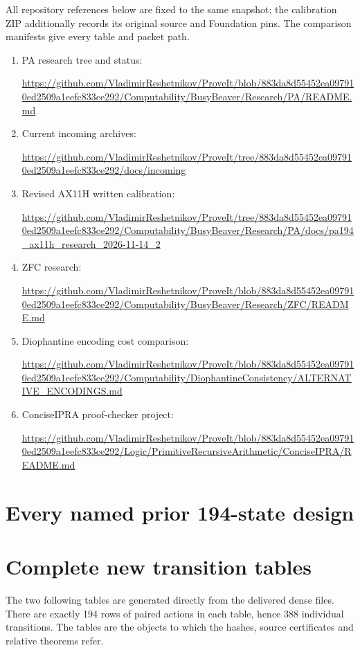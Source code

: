 \documentclass[11pt,a4paper]{article}
\newcommand{\repo}[1]{\url{https://github.com/VladimirReshetnikov/ProveIt/blob/883da8d55452ea097910ed2509a1eefc833ce292/#1}}
\begin{document}
All repository references below are fixed to the same snapshot; the
calibration ZIP additionally records its original source and Foundation
pins. The comparison manifests give every table and packet path.

\begin{enumerate}
\item PA research tree and status:\par
\repo{Computability/BusyBeaver/Research/PA/README.md}
\item Current incoming archives:\par
\url{https://github.com/VladimirReshetnikov/ProveIt/tree/883da8d55452ea097910ed2509a1eefc833ce292/docs/incoming}
\item Revised AX11H written calibration:\par
\url{https://github.com/VladimirReshetnikov/ProveIt/tree/883da8d55452ea097910ed2509a1eefc833ce292/Computability/BusyBeaver/Research/PA/docs/pa194_ax11h_research_2026-11-14_2}
\item ZFC research:\par
\repo{Computability/BusyBeaver/Research/ZFC/README.md}
\item Diophantine encoding cost comparison:\par
\repo{Computability/DiophantineConsistency/ALTERNATIVE_ENCODINGS.md}
\item ConciseIPRA proof-checker project:\par
\repo{Logic/PrimitiveRecursiveArithmetic/ConciseIPRA/README.md}
\end{enumerate}

\appendix
\clearpage
\section{Every named prior 194-state design}
\label{app:named}


\clearpage
\section{Complete new transition tables}
\label{app:tables}
The two following tables are generated directly from the delivered dense
 files. There are exactly 194 rows of paired actions in
each table, hence 388 individual transitions. The tables are the objects
to which the hashes, source certificates and relative theorems refer.


\end{document}
